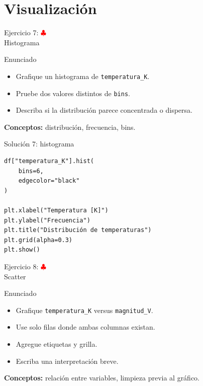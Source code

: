 \documentclass[10pt]{beamer}
\begin{document}
\section{Visualización}

\begin{frame}{Ejercicio 7: \hfill \textcolor{red}{$\clubsuit$} \\ Histograma}
  \begin{block}{Enunciado}
    \begin{itemize}
      \item Grafique un histograma de \texttt{temperatura\_K}.
      \item Pruebe dos valores distintos de \texttt{bins}.
      \item Describa si la distribución parece concentrada o dispersa.
    \end{itemize}
  \end{block}
  \textbf{Conceptos:} distribución, frecuencia, bins.
\end{frame}

\begin{solutionblock}
\begin{frame}[fragile,shrink=5]{Solución 7: histograma}
\begin{verbatim}
df["temperatura_K"].hist(
    bins=6,
    edgecolor="black"
)

plt.xlabel("Temperatura [K]")
plt.ylabel("Frecuencia")
plt.title("Distribución de temperaturas")
plt.grid(alpha=0.3)
plt.show()
\end{verbatim}
\end{frame}
\end{solutionblock}

\begin{frame}{Ejercicio 8: \hfill \textcolor{red}{$\clubsuit$} \\ Scatter}
  \begin{block}{Enunciado}
    \begin{itemize}
      \item Grafique \texttt{temperatura\_K} versus \texttt{magnitud\_V}.
      \item Use solo filas donde ambas columnas existan.
      \item Agregue etiquetas y grilla.
      \item Escriba una interpretación breve.
    \end{itemize}
  \end{block}
  \textbf{Conceptos:} relación entre variables, limpieza previa al gráfico.
\end{frame}
\end{document}
